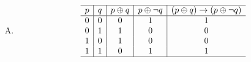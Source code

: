 {{\begin{practices}
\begin{enumerate}[A.]
{\begin{table}[H]
\[\begin{array}{c|c|c|c|c|c}
                                0 & 0 & 1 & 1 & 0 & 1 \\
                                0 & 1 & 0 & 0 & 1 & 1 \\
                                0 & 1 & 1 & 0 & 0 & 0 \\
                                1 & 0 & 0 & 0 & 0 & 0 \\
                                1 & 0 & 1 & 0 & 1 & 1 \\
                                1 & 1 & 0 & 1 & 0 & 1 \\
                                1 & 1 & 1 & 1 & 1 & 0 \\
                                \hline
                            \end{array}
                        \]
                    \end{table}
                }
                \item
                {
                    \begin{table}[H]
                        \[
                            \begin{array}{c|c|c|c|c}
                                \hline
                                p & q & p \oplus q & p \oplus \neg q & (p \oplus q) \rightarrow (p \oplus \neg q) \\
                                \hline
                                0 & 0 & 0 & 1 & 1 \\
                                0 & 1 & 1 & 0 & 0 \\
                                1 & 0 & 1 & 0 & 0 \\
                                1 & 1 & 0 & 1 & 1 \\
                                \hline
                            \end{array}
                        \]
                    \end{table}
                }
            \end{enumerate}
        \end{practices}

}}

